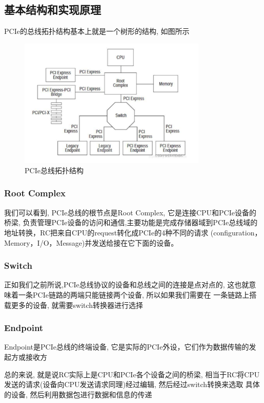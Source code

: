 \documentclass[14pt]{article}
\begin{document}
\subsection{基本结构和实现原理}
  PCIe的总线拓扑结构基本上就是一个树形的结构, 如图所示
\begin{figure}[H]
    \centering
    \includegraphics[width=0.8\textwidth]{pcle_1.jpg}
    \caption{PCIe总线拓扑结构}
\end{figure}
\subsubsection{Root Complex}
我们可以看到, PCIe总线的根节点是Root Complex, 它是连接CPU和PCIe设备的桥梁, 负责管理PCIe设备的访问和通信,主要功能是完成存储器域到PCIe总线域的地址转换，RC把来自CPU的request转化成PCIe的4种不同的请求
(configuration， Memory，I/O，Message)并发送给接在它下面的设备。\par
\subsubsection{Switch}
正如我们之前所说,PCIe总线协议的设备和总线之间的连接是点对点的, 这也就意味着一条PCIe链路的两端只能链接两个设备, 所以如果我们需要在
一条链路上搭载更多的设备, 就需要switch转换器进行选择\par
\subsubsection{Endpoint}
Endpoint是PCIe总线的终端设备, 它是实际的PCIe外设，它们作为数据传输的发起方或接收方\par
总的来说, 就是说RC实际上是CPU和PCIe各个设备之间的桥梁, 相当于RC将CPU发送的请求(设备向CPU发送请求同理)经过编辑, 然后经过switch转换来选取
具体的设备, 然后利用数据包进行数据和信息的传递
\end{document}
